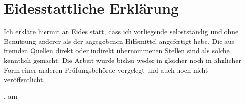 \chapter*{Eidesstattliche Erklärung}
\thispagestyle{empty}
Ich erkläre hiermit an Eides statt, dass ich vorliegende \mykindofthesis{} selbstständig und ohne Benutzung anderer als der angegebenen Hilfsmittel angefertigt habe. Die aus fremden Quellen direkt oder indirekt übernommenen Stellen sind als solche kenntlich gemacht. Die Arbeit wurde bisher weder in gleicher noch in ähnlicher Form einer anderen Prüfungsbehörde vorgelegt und auch noch nicht veröffentlicht.

\vspace*{50mm}

\mysubmissiontown{}, am \mysubmissionday{} \mysubmissionmonth{} \mysubmissionyear{}\hfill\myauthor{}
